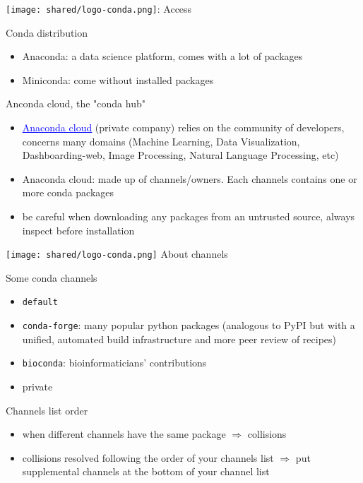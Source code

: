 \begin{frame}{\texttt{[image: shared/logo-conda.png]}: Access}
\begin{block}{Conda distribution}
\begin{itemize}
        \item Anaconda: a data science platform, comes with a lot of packages
        \item Miniconda: come without installed packages
\end{itemize}
\end{block}
\begin{block}{Anconda cloud, the "conda hub"}
\begin{itemize}
    \item \href{http://anaconda.org/}{\textcolor{blue}{\underline{Anaconda cloud}}}
    (private company) relies on the community of developers, concerns many domains (Machine Learning, Data Visualization, Dashboarding-web, Image Processing, Natural Language Processing, etc)
    \item Anaconda cloud: made up of channels/owners. Each channels contains one or more conda packages 
    \item be careful when downloading any packages from an untrusted source, always inspect before installation
\end{itemize}
\end{block}
\end{frame}
\begin{frame}[containsverbatim]
{\texttt{[image: shared/logo-conda.png]} About channels}
\begin{block}{Some conda channels}
\begin{itemize}
    \item \verb|default|
    \item \verb|conda-forge|: many popular python packages (analogous to PyPI but with a unified, automated build infrastructure and more peer review of recipes)
    \item \verb|bioconda|: bioinformaticians' contributions
    \item private
\end{itemize}
\end{block}

\begin{block}{Channels list order}
\begin{itemize}
    \item when different channels have the same package $\Rightarrow$ collisions
    \item collisions resolved following the order of your channels list $\Rightarrow$ put supplemental channels at the bottom of your channel list
\end{itemize}
\end{block}
\end{frame}
